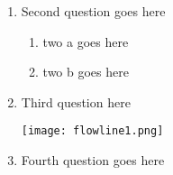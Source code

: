 \documentclass{article}
\begin{document}
\begin{enumerate}
    \item %
        Second question goes here
        \begin{enumerate}
            \item %
                two a goes here
            \item %
                two b goes here
        \end{enumerate}
    \item %
        Third question here
        \begin{center}
            \texttt{[image: flowline1.png]}
        \end{center}
    \item %
        Fourth question goes here
\end{enumerate}
\end{document}
